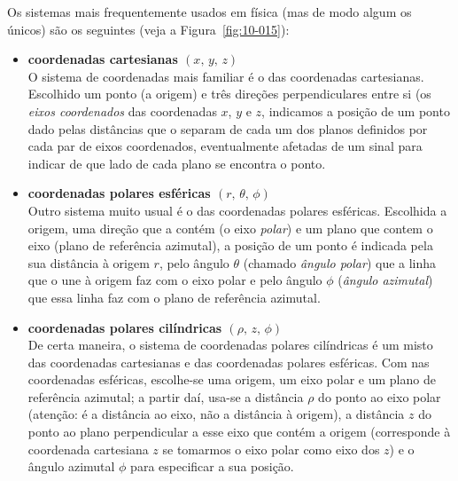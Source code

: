 Os sistemas mais frequentemente usados em física (mas de modo algum os únicos)
são os seguintes (veja a Figura~\ref{fig:10-015}):
\begin{itemize}
\item\textbf{coordenadas cartesianas $(x,\,y,\,z)$}\\
    O sistema de coordenadas mais familiar é o das coordenadas cartesianas.
    Escolhido um ponto (a origem) e três direções perpendiculares entre si (os
    \emph{eixos coordenados} das coordenadas $x$, $y$ e $z$, indicamos a posição
    de um ponto dado pelas distâncias que o separam de cada um dos planos
    definidos por cada par de eixos coordenados, eventualmente afetadas de um
    sinal para indicar de que lado de cada plano se encontra o ponto.
\item\textbf{coordenadas polares esféricas $(r,\,\theta,\,\phi)$}\\
    Outro sistema muito usual é o das coordenadas polares esféricas. Escolhida a
    origem, uma direção que a contém (o eixo \emph{polar}) e um plano que contem
    o eixo (plano de referência azimutal), a posição de um ponto é indicada pela
    sua distância à origem $r$, pelo ângulo $\theta$ (chamado \emph{ângulo
    polar}) que a linha que o une à origem faz com o eixo polar e pelo ângulo
    $\phi$ (\emph{ângulo azimutal}) que essa linha faz com o plano de referência
    azimutal.
\item\textbf{coordenadas polares cilíndricas $(\rho,\,z,\,\phi)$}\\
    De certa maneira, o sistema de coordenadas polares cilíndricas é um misto
    das coordenadas cartesianas e das coordenadas polares esféricas. Com nas
    coordenadas esféricas, escolhe-se uma origem, um eixo polar e um plano de
    referência azimutal; a partir daí, usa-se a distância $\rho$ do ponto ao
    eixo polar (atenção: é a distância ao eixo, não a distância à origem), a
    distância $z$ do ponto ao plano perpendicular a esse eixo que contém a
    origem (corresponde à coordenada cartesiana $z$ se tomarmos o eixo polar
    como eixo dos $z$) e o ângulo azimutal $\phi$ para especificar a sua
    posição.
\end{itemize}
